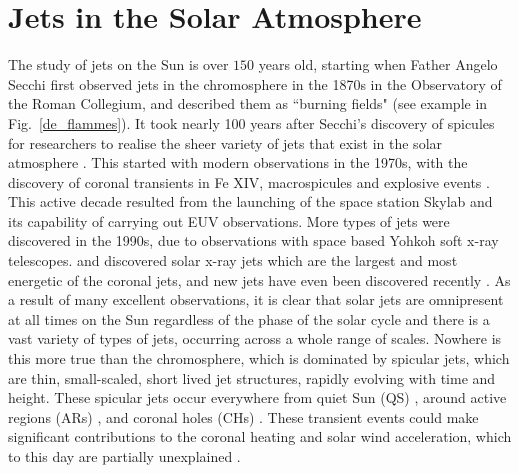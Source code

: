 \section{Jets in the Solar Atmosphere}
\label{sec:spicule-jets}
The study of jets on the Sun is over $150$ years old, starting when Father Angelo Secchi first observed jets in the chromosphere in the 1870s in the Observatory of the Roman Collegium, and described them as ``burning fields" (see example in Fig.~\ref{de_flammes}). It took nearly 100 years after Secchi's discovery of spicules for researchers to realise the sheer variety of jets that exist in the solar atmosphere \citep{Raouafi2016}. This started with modern observations in the 1970s, with the discovery of coronal transients in Fe XIV, macrospicules and explosive events \citep{Demastus1973, Bohlin1975ApJ197L133B, Withbroe1976ApJ, Brueckner1980HiA}. This active decade resulted from the launching of the space station Skylab and its capability of carrying out EUV observations. More types of jets were discovered in the 1990s, due to observations with space based Yohkoh soft x-ray telescopes. \cite{Shibata1992PASJ} and \cite{Strong1992PASJ} discovered solar x-ray jets which are the largest and most energetic of the coronal jets, and new jets have even been discovered recently \citep{Cho2019ApJ884L38C}. \np
%
As a result of many excellent observations, it is clear that solar jets are omnipresent at all times on the Sun regardless of the phase of the solar cycle and there is a vast variety of types of jets, occurring across a whole range of scales. Nowhere is this more true than the chromosphere, which is dominated by spicular jets, which are thin, small-scaled, short lived jet structures, rapidly evolving with time and height. These spicular jets occur everywhere from quiet Sun (QS) \citep{Pontieu2007astroph2081D,Rouppe2007ApJ660L169R,Pereira2012,Pereira2014ApJ}, around active regions (ARs) \citep{Pontieu2007astroph2081D,Pereira2012,Rouppe2013ApJ77656R,Gafeira2017ApJS2296G}, and coronal holes (CHs) \citep{Yamauchi2005ApJ629572Y,Moreno2008ApJ673L211M,Pereira2012,Young2015ApJ801124Y}. These transient events could make significant contributions to the coronal heating and solar wind acceleration, which to this day are partially unexplained \citep{Mart2017Sci3561269M, Pontieu2017ApJ, Samanta2019Sci, Zuo2019AcASn, Bale2019Natur}. \np
%

